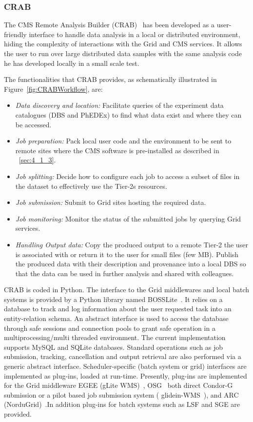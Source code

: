 %
\label{sec:3_2}
\subsubsection{CRAB}
\label{sec:CRAB}
The CMS Remote Analysis Builder (CRAB)~\cite{RefCRAB} has been developed as a user-friendly interface to handle data analysis in a local or distributed environment, hiding the complexity of interactions with the Grid and CMS services.
It allows the user to run over large distributed data samples with the same analysis code he has developed 
locally in a small scale test. 

The functionalities that CRAB provides, as schematically illustrated in Figure~\ref{fig:CRABWorkflow}, are:
\begin{itemize}
\item{\it{Data discovery and location:}}
Facilitate queries of the experiment data catalogues (DBS and PhEDEx) to find 
what data exist and where they can be accessed.
\item{\it{Job preparation:}}
Pack local user code and the environment to be sent to remote sites where the CMS software is pre-installed as described in ~\ref{sec:4_1_3}.
\item{\it{Job splitting:}}
Decide how to configure each job to access a subset of files in the dataset to effectively use the Tier-2s resources.
\item{\it{Job submission:}}
Submit to Grid sites hosting the required data.
\item{\it{Job monitoring:}}
Monitor the status of the submitted jobs by querying Grid services.
\item{\it{Handling Output data:}}
Copy the produced output to a remote Tier-2 the user is associated with or return it to the user for small files (few MB).
Publish the produced data with their description and provenance into a local DBS so that the data can be used in further analysis and shared with colleagues.
\end{itemize} 

CRAB is coded in Python. The interface to the Grid middlewares and local batch systems is provided by a Python library named BOSSLite~\cite{RefBOSSLite}. It relies on a database to track and log information about the user requested task into an entity-relation schema.
An abstract interface is used to access the database through safe sessions and connection pools to grant safe operation in a multiprocessing/multi threaded environment. The current implementation supports MySQL and SQLite databases.
Standard operations such as job submission, tracking, cancellation and output retrieval are also performed via a generic abstract interface. Scheduler-specific (batch system or grid) interfaces are implemented as plug-ins, loaded at run-time. Presently, plug-ins are implemented for the Grid middleware EGEE (gLite WMS)~\cite{RefgLiteWMS}, OSG~\cite{RefOSG} both direct Condor-G submission or a pilot based job submission system ( glidein-WMS~\cite{Refglidein}), and ARC (NorduGrid)~\cite{RefARC}.In addition plug-ins for batch systems such as LSF and SGE are provided.

